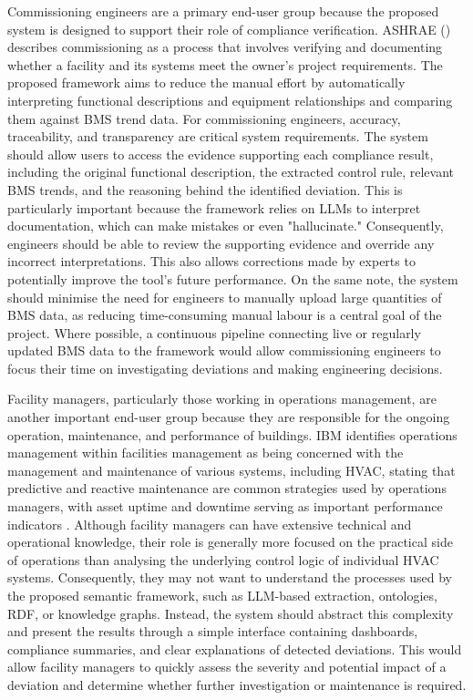 \documentclass{article}
\begin{document}
Commissioning engineers are a primary end-user group because the proposed system is designed to support their role of compliance verification. ASHRAE (\citeyear{ashrae2019}) describes commissioning as a process that involves verifying and documenting whether a facility and its systems meet the owner's project requirements. The proposed framework aims to reduce the manual effort by automatically interpreting functional descriptions and equipment relationships and comparing them against BMS trend data. For commissioning engineers, accuracy, traceability, and transparency are critical system requirements. The system should allow users to access the evidence supporting each compliance result, including the original functional description, the extracted control rule, relevant BMS trends, and the reasoning behind the identified deviation. This is particularly important because the framework relies on LLMs to interpret documentation, which can make mistakes or even "hallucinate." Consequently, engineers should be able to review the supporting evidence and override any incorrect interpretations. This also allows corrections made by experts to potentially improve the tool's future performance. On the same note, the system should minimise the need for engineers to manually upload large quantities of BMS data, as reducing time-consuming manual labour is a central goal of the project. Where possible, a continuous pipeline connecting live or regularly updated BMS data to the framework would allow commissioning engineers to focus their time on investigating deviations and making engineering decisions.

Facility managers, particularly those working in operations management, are another important end-user group because they are responsible for the ongoing operation, maintenance, and performance of buildings. IBM identifies operations management within facilities management as being concerned with the management and maintenance of various systems, including HVAC, stating that predictive and reactive maintenance are common strategies used by operations managers, with asset uptime and downtime serving as important performance indicators \parencite{flinders2026}. Although facility managers can have extensive technical and operational knowledge, their role is generally more focused on the practical side of operations than analysing the underlying control logic of individual HVAC systems. Consequently, they may not want to understand the processes used by the proposed semantic framework, such as LLM-based extraction, ontologies, RDF, or knowledge graphs. Instead, the system should abstract this complexity and present the results through a simple interface containing dashboards, compliance summaries, and clear explanations of detected deviations. This would allow facility managers to quickly assess the severity and potential impact of a deviation and determine whether further investigation or maintenance is required.
\end{document}
